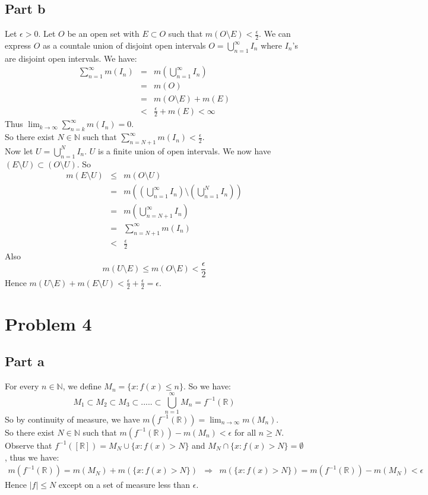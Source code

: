 \documentclass[12pt]{article}
\begin{document}
\subsection*{Part b}
Let $\epsilon >0$.
Let $O$ be an open set with $E \subset O$
such that $m(O\setminus E) < \frac{\epsilon}{2}$.
We can express $O$ as a countale union of disjoint open intervals $O=\bigcup_{n=1}^{\infty} I_n$ where $I_n$'s are disjoint open intervals.
We have:
\begin{eqnarray*}
\sum_{n=1}^{\infty} m(I_n) &= & 
m(\bigcup_{n=1}^{\infty} I_n) \\ &=&
m(O) \\ &=&
m(O\setminus E)+m(E) \\ &< &
\frac{\epsilon}{2}+m(E) < \infty
\end{eqnarray*}
Thus $\lim_{k \rightarrow \infty}
\sum_{n=k}^{\infty} m(I_n)=0$.  \\
So there exist $N \in \mathbb{N}$ such that
$\sum_{n=N+1}^{\infty} m(I_n) < \frac{\epsilon}{2}$.
\\
Now let $U=\bigcup_{n=1}^N I_n$. $U$ is a finite union of open intervals. We now have $(E\setminus U) \subset (O\setminus U)$. So
\begin{eqnarray*}
m(E\setminus U) &\le & m(O\setminus U)
\\ &=&
m((\bigcup_{n=1}^{\infty} I_n)\setminus (\bigcup_{n=1}^{N} I_n) )
\\ &=&
m(\bigcup_{n=N+1}^{\infty} I_n) \\ &=&
\sum_{n=N+1}^{\infty} m(I_n) \\ &<&
\frac{\epsilon}{2}
\end{eqnarray*}
Also
$$m(U\setminus E) \le m(O\setminus E) < \frac{\epsilon}{2}$$
Hence $m(U\setminus E)+m(E\setminus U) < \frac{\epsilon}{2}+\frac{\epsilon}{2}=\epsilon$.



\clearpage
\section*{Problem 4}
\subsection*{Part a}
For every $n \in \mathbb{N}$, we define $M_n=\{x:f(x) \le n\}$. So we have:
$$M_1 \subset M_2 \subset M_3 \subset ..... \subset
\bigcup_{n=1}^{\infty} M_n = f^{-1}(\mathbb{R})$$
So by continuity of measure, we have $m(f^{-1}(\mathbb{R}))=
\lim_{n \rightarrow \infty} m(M_n)$. \\
So there exist $N \in \mathbb{N}$ such that
$m(f^{-1}(\mathbb{R}))-m(M_n) < \epsilon$ for all $n \ge N$. \\
Observe that $f^{-1}([\mathbb{R}])=M_N \cup \{x:f(x) > N\}$
and $M_N \cap \{x:f(x) > N\}=\emptyset$, thus we have:
\begin{eqnarray*}
m(f^{-1}(\mathbb{R})) =  m(M_N)+m(\{x:f(x) > N\})
& \Rightarrow &
m(\{x:f(x) > N\})=m(f^{-1}(\mathbb{R}))-m(M_N) < \epsilon
\end{eqnarray*}
Hence $|f| \le N$ except on a set of measure less than $\epsilon$.
\end{document}
